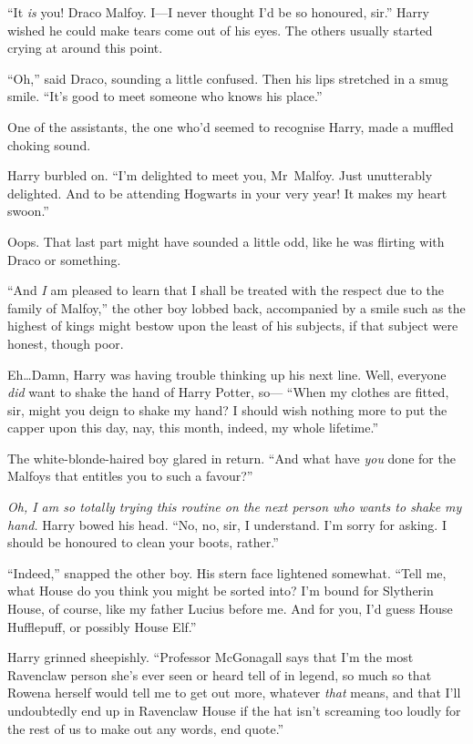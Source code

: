 “It \emph{is} you! Draco Malfoy. I—I never thought I’d be so honoured, sir.” Harry wished he could make tears come out of his eyes. The others usually started crying at around this point.

“Oh,” said Draco, sounding a little confused. Then his lips stretched in a smug smile. “It’s good to meet someone who knows his place.”

One of the assistants, the one who’d seemed to recognise Harry, made a muffled choking sound.

Harry burbled on. “I’m delighted to meet you, Mr~Malfoy. Just unutterably delighted. And to be attending Hogwarts in your very year! It makes my heart swoon.”

Oops. That last part might have sounded a little odd, like he was flirting with Draco or something.

“And \emph{I} am pleased to learn that I shall be treated with the respect due to the family of Malfoy,” the other boy lobbed back, accompanied by a smile such as the highest of kings might bestow upon the least of his subjects, if that subject were honest, though poor.

Eh…Damn, Harry was having trouble thinking up his next line. Well, everyone \emph{did} want to shake the hand of Harry Potter, so— “When my clothes are fitted, sir, might you deign to shake my hand? I should wish nothing more to put the capper upon this day, nay, this month, indeed, my whole lifetime.”

The white-blonde-haired boy glared in return. “And what have \emph{you} done for the Malfoys that entitles you to such a favour?”

\emph{Oh, I am so totally trying this routine on the next person who wants to shake my hand.} Harry bowed his head. “No, no, sir, I understand. I’m sorry for asking. I should be honoured to clean your boots, rather.”

“Indeed,” snapped the other boy. His stern face lightened somewhat. “Tell me, what House do you think you might be sorted into? I’m bound for Slytherin House, of course, like my father Lucius before me. And for you, I’d guess House Hufflepuff, or possibly House Elf.”

Harry grinned sheepishly. “Professor McGonagall says that I’m the most Ravenclaw person she’s ever seen or heard tell of in legend, so much so that Rowena herself would tell me to get out more, whatever \emph{that} means, and that I’ll undoubtedly end up in Ravenclaw House if the hat isn’t screaming too loudly for the rest of us to make out any words, end quote.”

